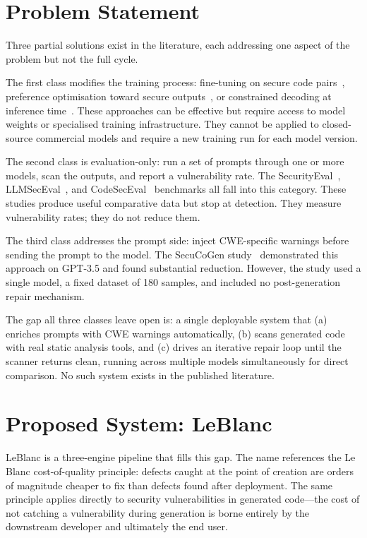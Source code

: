 \documentclass[12pt,a4paper]{report}
\begin{document}
\section{Problem Statement}
\label{sec:problem}

Three partial solutions exist in the literature, each addressing one aspect of
the problem but not the full cycle.

The first class modifies the training process: fine-tuning on secure code
pairs~\cite{hexacoder2024}, preference optimisation toward secure
outputs~\cite{lpo2024}, or constrained decoding at inference
time~\cite{codeguard2024}. These approaches can be effective but require access
to model weights or specialised training infrastructure. They cannot be applied
to closed-source commercial models and require a new training run for each
model version.

The second class is evaluation-only: run a set of prompts through one or more
models, scan the outputs, and report a vulnerability rate. The
SecurityEval~\cite{securityeval}, LLMSecEval~\cite{tony2023llmseceval}, and
CodeSecEval~\cite{codeseceval2023} benchmarks all fall into this category. These
studies produce useful comparative data but stop at detection. They measure
vulnerability rates; they do not reduce them.

The third class addresses the prompt side: inject CWE-specific warnings before
sending the prompt to the model. The SecuCoGen study~\cite{tihanyi2023secucogenicse}
demonstrated this approach on GPT-3.5 and found substantial reduction. However,
the study used a single model, a fixed dataset of 180 samples, and included no
post-generation repair mechanism.

The gap all three classes leave open is: a single deployable system that
(a) enriches prompts with CWE warnings automatically, (b) scans generated code
with real static analysis tools, and (c) drives an iterative repair loop until
the scanner returns clean, running across multiple models simultaneously for
direct comparison. No such system exists in the published literature.

\section{Proposed System: LeBlanc}
\label{sec:proposed}

LeBlanc is a three-engine pipeline that fills this gap. The name references the
Le Blanc cost-of-quality principle: defects caught at the point of creation are
orders of magnitude cheaper to fix than defects found after deployment. The same
principle applies directly to security vulnerabilities in generated code---the
cost of not catching a vulnerability during generation is borne entirely by the
downstream developer and ultimately the end user.
\end{document}
